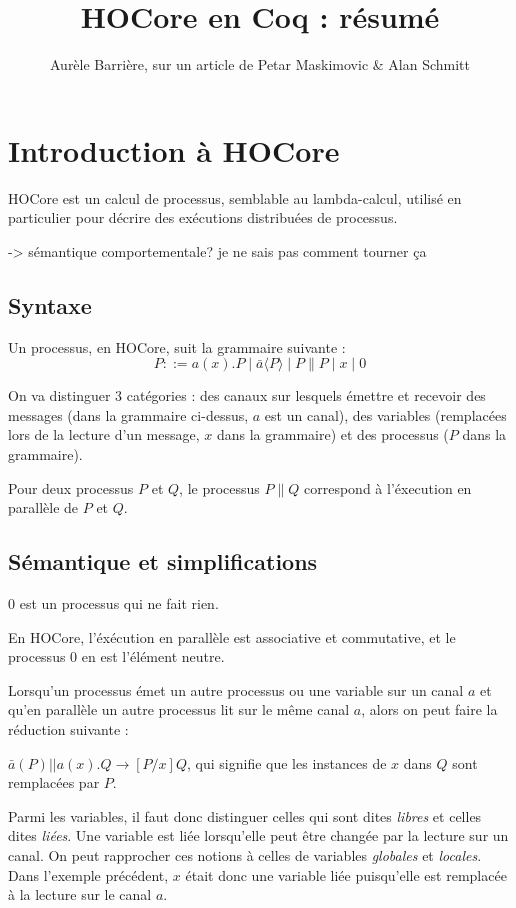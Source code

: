 \documentclass{article}
\title{HOCore en Coq : résumé}
\author{Aurèle Barrière, sur un article de Petar Maskimovic \& Alan Schmitt}
\begin{document}
\maketitle
\tableofcontents %
\section{Introduction à HOCore}
HOCore est un calcul de processus, semblable au lambda-calcul, utilisé en particulier pour décrire des exécutions distribuées de processus.

-> sémantique comportementale? je ne sais pas comment tourner ça

\subsection{Syntaxe}
Un processus, en HOCore, suit la grammaire suivante :
$$ P ::= a(x).P \mid \bar{a}\langle P\rangle \mid P\|P \mid x \mid 0 $$

On va distinguer 3 catégories : des canaux sur lesquels émettre et recevoir des messages (dans la grammaire ci-dessus, $a$ est un canal), des variables (remplacées lors de la lecture d'un message, $x$ dans la grammaire) et des processus ($P$ dans la grammaire).

Pour deux processus $P$ et $Q$, le processus $P\|Q$ correspond à l'éxecution en parallèle de $P$ et $Q$.


\subsection{Sémantique et simplifications}
$0$ est un processus qui ne fait rien.

En HOCore, l'éxécution en parallèle est associative et commutative, et le processus $0$ en est l'élément neutre.

Lorsqu'un processus émet un autre processus ou une variable sur un canal $a$ et qu'en parallèle un autre processus lit sur le même canal $a$, alors on peut faire la réduction suivante :

$\bar{a}(P)||a(x).Q \rightarrow [P/x]Q$, qui signifie que les instances de $x$ dans $Q$ sont remplacées par $P$.

Parmi les variables, il faut donc distinguer celles qui sont dites \textit{libres} et celles dites \textit{liées}. 
Une variable est liée lorsqu'elle peut être changée par la lecture sur un canal. On peut rapprocher ces notions à celles de variables \textit{globales} et \textit{locales}.
Dans l'exemple précédent, $x$ était donc une variable liée puisqu'elle est remplacée à la lecture sur le canal $a$. 
\end{document}
